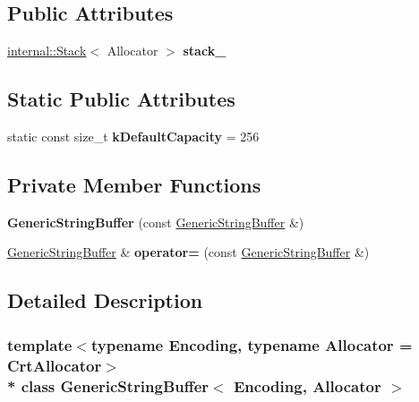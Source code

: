 \subsection*{Public Attributes}
\begin{DoxyCompactItemize}
\item 
\hyperlink{classinternal_1_1_stack}{internal\+::\+Stack}$<$ Allocator $>$ {\bfseries stack\+\_\+}\hypertarget{class_generic_string_buffer_aaef716643febb9de5957dbf8ff904409}{}\label{class_generic_string_buffer_aaef716643febb9de5957dbf8ff904409}

\end{DoxyCompactItemize}
\subsection*{Static Public Attributes}
\begin{DoxyCompactItemize}
\item 
static const size\+\_\+t {\bfseries k\+Default\+Capacity} = 256\hypertarget{class_generic_string_buffer_ae74f9df854dd5a7db4315ef44b016d22}{}\label{class_generic_string_buffer_ae74f9df854dd5a7db4315ef44b016d22}

\end{DoxyCompactItemize}
\subsection*{Private Member Functions}
\begin{DoxyCompactItemize}
\item 
{\bfseries Generic\+String\+Buffer} (const \hyperlink{class_generic_string_buffer}{Generic\+String\+Buffer} \&)\hypertarget{class_generic_string_buffer_aec9340c9906ce399bb142706a61a9501}{}\label{class_generic_string_buffer_aec9340c9906ce399bb142706a61a9501}

\item 
\hyperlink{class_generic_string_buffer}{Generic\+String\+Buffer} \& {\bfseries operator=} (const \hyperlink{class_generic_string_buffer}{Generic\+String\+Buffer} \&)\hypertarget{class_generic_string_buffer_a09937913fd2f426be04ae6d6a8abb0f6}{}\label{class_generic_string_buffer_a09937913fd2f426be04ae6d6a8abb0f6}

\end{DoxyCompactItemize}


\subsection{Detailed Description}
\subsubsection*{template$<$typename Encoding, typename Allocator = Crt\+Allocator$>$\\*
class Generic\+String\+Buffer$<$ Encoding, Allocator $>$}

